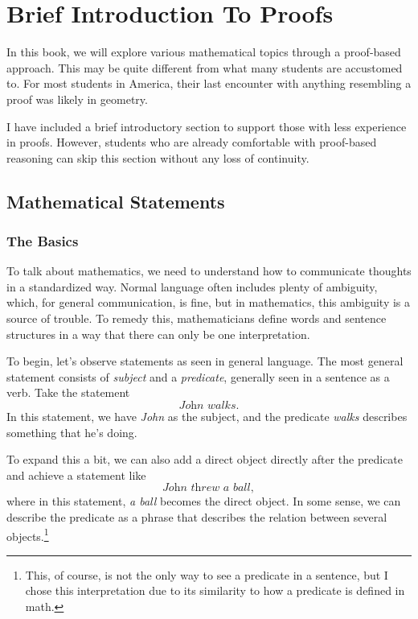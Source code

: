 \setcounter{chapter}{-1}


\edef\mychapter{Brief Introduction To Proofs}
\edef\mychapterdate{March 31, 2025}

\chapter{\mychapter}

In this book, we will explore various mathematical topics through a proof-based approach. This may be quite different from what many students are accustomed to. For most students in America, their last encounter with anything resembling a proof was likely in geometry.

I have included a brief introductory section to support those with less experience in proofs. However, students who are already comfortable with proof-based reasoning can skip this section without any loss of continuity.

\section{Mathematical Statements}
\subsection{The Basics}
To talk about mathematics, we need to understand how to communicate thoughts in a standardized way.
Normal language often includes plenty of ambiguity, which, for general communication, is fine, but in mathematics, this ambiguity is a source of trouble.
To remedy this, mathematicians define words and sentence structures in a way that there can only be one interpretation.

To begin, let's observe statements as seen in general language.
The most general statement consists of \textit{subject} and a \textit{predicate}, generally seen in a sentence as a verb.
Take the statement
$$\textit{John walks}.$$
In this statement, we have \textit{John} as the subject, and the predicate \textit{walks} describes something that he's doing.

To expand this a bit, we can also add a direct object directly after the predicate and achieve a statement like
$$\textit{John threw a ball},$$
where in this statement, \textit{a ball} becomes the direct object.
In some sense, we can describe the predicate as a phrase that describes the relation between several objects.\footnote{This, of course, is not the only way to see a predicate in a sentence, but I chose this interpretation due to its similarity to how a predicate is defined in math.}

